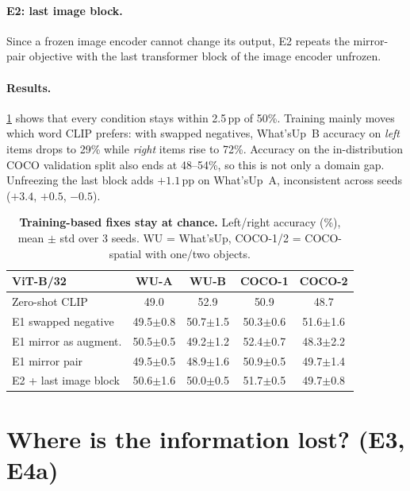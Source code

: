 \documentclass[10pt,twocolumn,letterpaper]{article}
\begin{document}
\paragraph{E2: last image block.}
Since a frozen image encoder cannot change its output, E2 repeats the mirror-pair objective with the last transformer block of the image encoder unfrozen.

\paragraph{Results.}
\cref{tab:train} shows that every condition stays within 2.5\,pp of 50\%.
Training mainly moves which word CLIP prefers: with swapped negatives, What'sUp~B accuracy on \emph{left} items drops to 29\% while \emph{right} items rise to 72\%.
Accuracy on the in-distribution COCO validation split also ends at 48--54\%, so this is not only a domain gap.
Unfreezing the last block adds $+1.1$\,pp on What'sUp~A, inconsistent across seeds ($+3.4$, $+0.5$, $-0.5$).

\begin{table}[t]
\centering
\small
\setlength{\tabcolsep}{3.5pt}
\begin{tabular}{@{}lcccc@{}}
\toprule
ViT-B/32 & WU-A & WU-B & COCO-1 & COCO-2 \\
\midrule
Zero-shot CLIP            & 49.0 & 52.9 & 50.9 & 48.7 \\
E1 swapped negative       & 49.5\scriptsize{$\pm$0.8} & 50.7\scriptsize{$\pm$1.5} & 50.3\scriptsize{$\pm$0.6} & 51.6\scriptsize{$\pm$1.6} \\
E1 mirror as augment.     & 50.5\scriptsize{$\pm$0.5} & 49.2\scriptsize{$\pm$1.2} & 52.4\scriptsize{$\pm$0.7} & 48.3\scriptsize{$\pm$2.2} \\
E1 mirror pair            & 49.5\scriptsize{$\pm$0.5} & 48.9\scriptsize{$\pm$1.6} & 50.9\scriptsize{$\pm$0.5} & 49.7\scriptsize{$\pm$1.4} \\
E2 + last image block     & 50.6\scriptsize{$\pm$1.6} & 50.0\scriptsize{$\pm$0.5} & 51.7\scriptsize{$\pm$0.5} & 49.7\scriptsize{$\pm$0.8} \\
\bottomrule
\end{tabular}
\caption{\textbf{Training-based fixes stay at chance.} Left/right accuracy (\%), mean $\pm$ std over 3 seeds. WU = What'sUp, COCO-1/2 = COCO-spatial with one/two objects.}
\label{tab:train}
\end{table}

\section{Where is the information lost? (E3, E4a)}
\label{sec:diag}
\end{document}
